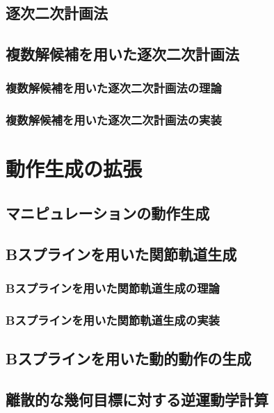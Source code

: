 \documentclass[]{jarticle}
\begin{document}
\subsection{逐次二次計画法} \label{sec:sqp}

\subsection{複数解候補を用いた逐次二次計画法} \label{sec:sqp-msc}
\subsubsection{複数解候補を用いた逐次二次計画法の理論}

\subsubsection{複数解候補を用いた逐次二次計画法の実装}


\section{動作生成の拡張} \label{chap:extended}
\subsection{マニピュレーションの動作生成} \label{sec:manip}


\subsection{Bスプラインを用いた関節軌道生成} \label{sec:bspline}
\subsubsection{Bスプラインを用いた関節軌道生成の理論}

\subsubsection{Bスプラインを用いた関節軌道生成の実装}

\subsection{Bスプラインを用いた動的動作の生成} \label{sec:dynamic}

\subsection{離散的な幾何目標に対する逆運動学計算} \label{sec:discrete-ik}
\end{document}
